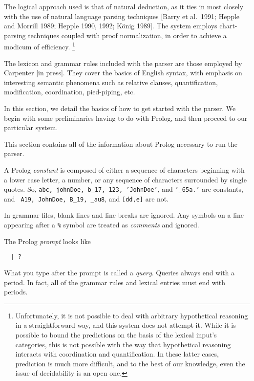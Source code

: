 The logical approach used is that of natural deduction, as it ties in
most closely with the use of natural language parsing techniques
[Barry et al.~1991; Hepple and Morrill 1989; Hepple 1990, 1992;
K\"onig 1989].  The system employs chart-parsing techniques coupled
with proof normalization, in order to achieve a modicum of
efficiency.%
%
\footnote{Unfortunately, it is not possible to deal with arbitrary
hypothetical reasoning in a straightforward way, and this system does
not attempt it.  While it is possible to bound the predictions on the
basis of the lexical input's categories, this is not possible with the
way that hypothetical reasoning interacts with coordination and
quantification.  In these latter cases, prediction is much more
difficult, and to the best of our knowledge, even the issue of
decidability is an open one.}

The lexicon and grammar rules included with the parser are those
employed by Carpenter [in press].  They cover the basics of English
syntax, with emphasis on interesting semantic phenomena such as
relative clauses, quantification, modification, coordination,
pied-piping, etc.



In this section, we detail the basics of how to get started with the
parser.  We begin with some preliminaries having to do with Prolog,
and then proceed to our particular system.


This section contains all of the information about
Prolog necessary to run the parser. 

A Prolog {\it constant} is composed of either a sequence of characters
beginning with a lower case letter, a number, or any sequence of
characters surrounded by single quotes.  So, {\tt abc, johnDoe,
b{\_}17, 123, 'JohnDoe'}, and {\tt '{\_}65a.'} are constants, and {\tt
A19, JohnDoe, B{\_}19, {\_}au8}, and {\tt [dd,e]} are not.

In grammar files, blank lines and line breaks are ignored.
Any symbols on a line appearing after a {\tt \%} symbol are treated
as {\it comments} and ignored.

The Prolog {\it prompt} looks like
\begin{verbatim}
  | ?- 
\end{verbatim}
What you type after the prompt is called a {\it query}.  Queries
always end with a period.  In fact, all of the grammar rules and
lexical entries must end with periods.

